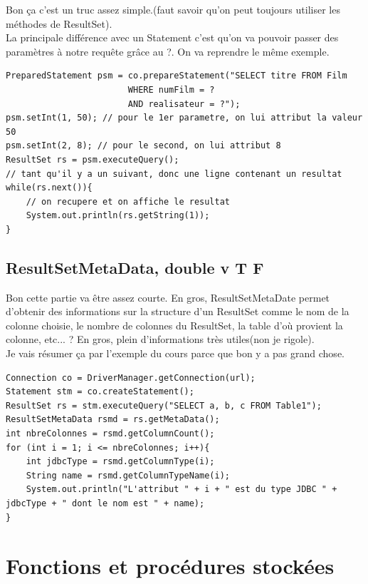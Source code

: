 \documentclass{report}
\begin{document}
Bon ça c'est un truc assez simple.(faut savoir qu'on peut toujours utiliser les méthodes de ResultSet).\\
La principale différence avec un Statement c'est qu'on va pouvoir passer des paramètres à notre requête grâce au ?. On va reprendre le même exemple.
\begin{lstlisting}[style=MyJavaStyle]
PreparedStatement psm = co.prepareStatement("SELECT titre FROM Film 
					    WHERE numFilm = ?
					    AND realisateur = ?");
psm.setInt(1, 50); // pour le 1er parametre, on lui attribut la valeur 50
psm.setInt(2, 8); // pour le second, on lui attribut 8
ResultSet rs = psm.executeQuery();
// tant qu'il y a un suivant, donc une ligne contenant un resultat
while(rs.next()){
	// on recupere et on affiche le resultat
	System.out.println(rs.getString(1)); 
}
\end{lstlisting}

\section{ResultSetMetaData, double v T F}
Bon cette partie va être assez courte. En gros, ResultSetMetaDate permet d'obtenir des informations sur la structure d'un ResultSet comme le nom de la colonne choisie, le nombre de colonnes du ResultSet, la table d'où provient la colonne, etc... ? En gros, plein d'informations très utiles(non je rigole).\\
Je vais résumer ça par l'exemple du cours parce que bon y a pas grand chose.
\begin{lstlisting}[style=MyJavaStyle]
Connection co = DriverManager.getConnection(url);
Statement stm = co.createStatement();
ResultSet rs = stm.executeQuery("SELECT a, b, c FROM Table1");
ResultSetMetaData rsmd = rs.getMetaData();
int nbreColonnes = rsmd.getColumnCount();
for (int i = 1; i <= nbreColonnes; i++){
	int jdbcType = rsmd.getColumnType(i);
	String name = rsmd.getColumnTypeName(i);
	System.out.println("L'attribut " + i + " est du type JDBC " + 		jdbcType + " dont le nom est " + name);
}
\end{lstlisting}

\chapter{Fonctions et procédures stockées}
\end{document}
